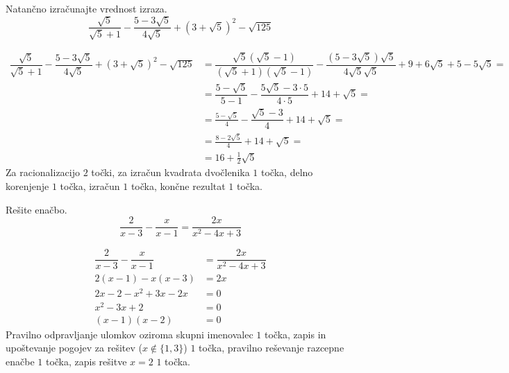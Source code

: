 \documentclass[addpoints]{exam}
\begin{document}
\begin{questions}


    \question[6]
    Natančno izračunajte vrednost izraza.
    $$ \dfrac{\sqrt{5}}{\sqrt{5}+1}-\dfrac{5-3\sqrt{5}}{4\sqrt{5}}+\left(3+\sqrt{5}\right)^2-\sqrt{125} $$

    \begin{solution}[7cm]
        \begin{align*} 
            \dfrac{\sqrt{5}}{\sqrt{5}+1}-\dfrac{5-3\sqrt{5}}{4\sqrt{5}}+\left(3+\sqrt{5}\right)^2-\sqrt{125}&=\dfrac{\sqrt{5}(\sqrt{5}-1)}{(\sqrt{5}+1)(\sqrt{5}-1)}-\dfrac{(5-3\sqrt{5})\sqrt{5}}{4\sqrt{5}\sqrt{5}}+9+6\sqrt{5}+5-5\sqrt{5}= \\
                                                                                                            &=\dfrac{5-\sqrt{5}}{5-1}-\dfrac{5\sqrt{5}-3\cdot 5}{4\cdot 5}+14+\sqrt{5}= \\
                                                                                                            &=\frac{5-\sqrt{5}}{4}-\dfrac{\sqrt{5}-3}{4}+14+\sqrt{5}= \\
                                                                                                            &=\frac{8-2\sqrt{5}}{4}+14+\sqrt{5}= \\
                                                                                                            &=16+\frac{1}{2}\sqrt{5}
        \end{align*}
        Za racionalizacijo $2$ točki, za izračun kvadrata dvočlenika $1$ točka, delno korenjenje $1$ točka, izračun $1$ točka, končne rezultat $1$ točka.
    \end{solution}
    
    

    \question[4]
    Rešite enačbo.
    $$ \dfrac{2}{x-3}-\dfrac{x}{x-1}=\dfrac{2x}{x^2-4x+3} $$
    
    
    \begin{solution}[4cm]
        \begin{align*} 
            \dfrac{2}{x-3}-\dfrac{x}{x-1} &=\dfrac{2x}{x^2-4x+3} \\
            2(x-1)-x(x-3) &= 2x \\
            2x-2-x^2+3x-2x &=0 \\
            x^2-3x+2 &=0 \\
            (x-1)(x-2) &=0
        \end{align*}
        Pravilno odpravljanje ulomkov oziroma skupni imenovalec $1$ točka, zapis in upoštevanje pogojev za rešitev ($x\notin\{1,3\}$) $1$ točka, pravilno reševanje razcepne enačbe $1$ točka, zapis rešitve $x=2$ $1$ točka.
    \end{solution}


\end{questions}
\end{document}
